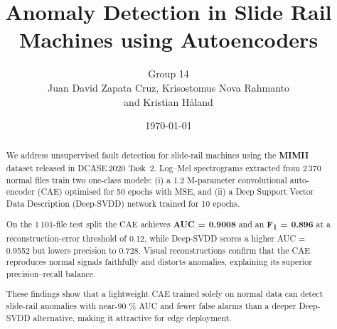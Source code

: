 \documentclass[a4paper,11pt,english]{article}
\title{Anomaly Detection in Slide Rail Machines using Autoencoders}
\author{Group 14 \\ Juan David Zapata Cruz, Krisostomus Nova Rahmanto \\ and Kristian Håland}
\date{\today}
\begin{document}
\maketitle

\begin{abstract}

We address unsupervised fault detection for slide-rail machines using the
\textbf{MIMII} dataset released in DCASE\,2020 Task~2.
Log–Mel spectrograms extracted from 2\,370 normal files train two
one-class models: (i) a 1.2 M-parameter convolutional auto-encoder (CAE)
optimised for 50 epochs with MSE, and (ii) a Deep Support Vector Data
Description (Deep-SVDD) network trained for 10 epochs.

On the 1\,101-file test split the CAE achieves
\textbf{AUC = 0.9008} and an
\textbf{F\textsubscript{1} = 0.896} at a reconstruction-error threshold
of 0.12, while Deep-SVDD scores a higher
AUC = 0.9552 but lowers precision to 0.728.
Visual reconstructions confirm that the CAE reproduces normal signals
faithfully and distorts anomalies, explaining its superior
precision–recall balance.

These findings show that a lightweight CAE trained solely on normal data
can detect slide-rail anomalies with near-90 \% AUC and fewer false
alarms than a deeper Deep-SVDD alternative, making it attractive for
edge deployment.

\end{abstract}







\end{document}
